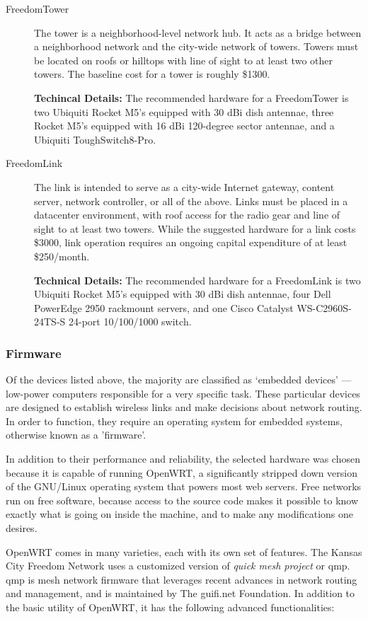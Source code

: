 \begin{description}
\item[FreedomTower] The tower is a neighborhood-level network hub. It
acts as a bridge between a neighborhood network and the city-wide network of
towers. Towers must be located on roofs or hilltops with line of sight to
at least two other towers.
 The baseline cost for a tower is roughly \$1300. \par
{\bf Techincal Details:} The recommended hardware for a FreedomTower is two Ubiquiti Rocket M5's equipped
with 30 dBi dish antennae, three Rocket M5's equipped with 16 dBi 120-degree
sector antennae, and a Ubiquiti ToughSwitch8-Pro. 

\item[FreedomLink] The link is intended to serve as a city-wide 
Internet gateway, content server, network controller, or all of the above. Links must be placed in a
datacenter environment, with roof access for the radio gear and line of sight to
at least two towers. While the suggested hardware for a link costs \$3000, link
operation requires an ongoing capital expenditure of at least \$250/month. \par
{\bf Technical Details:} The 
recommended hardware for a FreedomLink is two Ubiquiti Rocket M5's equipped with 30 dBi dish
antennae, four Dell PowerEdge 2950 rackmount servers, and one Cisco Catalyst
WS-C2960S-24TS-S 24-port 10/100/1000 switch. 
\end{description}

\subsubsection{Firmware}
Of the devices listed above, the majority are classified as `embedded
devices' --- low-power computers responsible for a very specific task. These
particular devices are designed to establish wireless links and make decisions
about network routing. In order to function, they require an operating system
for embedded systems, otherwise known as a 'firmware'. \par
In addition to their performance and reliability, the selected hardware was
chosen because it is capable of running OpenWRT, a significantly stripped down
version of the GNU/Linux operating system that powers most web servers. Free
networks run on free software, because access to the source code makes it
possible to know exactly what is going on inside the machine, and to
make any modifications one desires. \par 
OpenWRT comes in many varieties, each with its own set of features. The Kansas
City Freedom Network uses a customized version of \emph{quick mesh project} or
qmp. qmp is mesh network firmware that leverages recent advances in network
routing and management, and is maintained by The guifi.net Foundation. In
addition to the basic utility of OpenWRT, it has the following advanced
functionalities:

